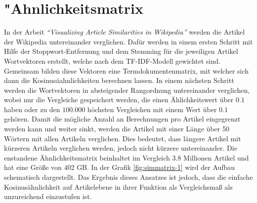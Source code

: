  

\section{"Ahnlichkeitsmatrix}
\label{subchap:simmatrix}


 

In der Arbeit \emph{"`Visualizing Article Similarities in Wikipedia"'} \cite{riehmann2016visualizing} werden die Artikel der Wikipedia untereinander verglichen.
Dafür werden in einem ersten Schritt mit Hilfe der Stoppwort-Entfernung und dem Stemming für die jeweiligen Artikel Wortvektoren erstellt, welche nach dem TF-IDF-Modell gewichtet sind.
Gemeinsam bilden diese Vektoren eine Termdokumentenmatrix, mit welcher sich dann die Kosinusäahnlichkeiten berechnen lassen.
In einem nächsten Schritt werden die Wortvektoren in absteigender Rangordnung untereinander verglichen, wobei nur die Vergleiche gespeichert werden, die einen Ählichkeitswert über $0.1$ haben oder zu den $100.000$ höchsten Vergleichen mit einem Wert über $0.1$ gehören.
Damit die mögliche Anzahl an Berechnungen pro Artikel eingegrenzt werden kann und weiter sinkt, werden die Artikel mit einer Länge über 50 Wörtern mit allen Artikeln verglichen.
Dies bedeutet, dass längere Artikel mit kürzeren Artikeln verglichen werden, jedoch nicht kürzere untereinander.
Die enstandene Ähnlichkeitsmatrix beinhaltet im Vergleich 3.8 Millionen Artikel und hat eine Größe von 402 GB.
In der Grafik \ref{fig:simmatrix-1} wird der Aufbau schematisch dargestellt.
Das Ergebnis dieses Ansatzes ist jedoch, dass die einfache Kosinusähnlichkeit auf Artikelebene in ihrer Funktion als Vergleichsmaß als unzureichend einzustufen ist.

